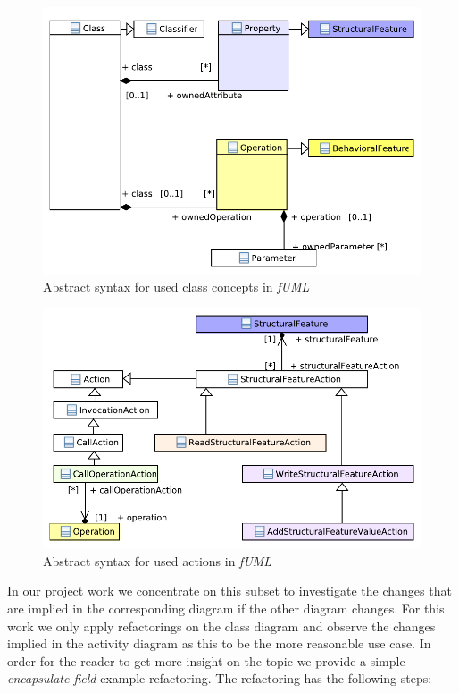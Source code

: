 \documentclass{llncs}
\begin{document}
\begin{figure}[h!t]
 \centering
 \includegraphics[scale=0.9]{images/Model_Model_Classifiers}
 \caption{Abstract syntax for used class concepts in \textit{fUML}}
 \label{fig:fuml1}
\end{figure}

\begin{figure}[h!t]
 \centering
 \includegraphics[scale=0.9]{images/Model_Model_Behavior}
 \caption{Abstract syntax for used actions in \textit{fUML}}
 \label{fig:fuml2}
\end{figure}

In our project work we concentrate on this subset to investigate the changes that are implied in the corresponding diagram if the other diagram changes. For this work we only apply refactorings on the class diagram and observe the changes implied in the activity diagram as this to be the more reasonable use case. In order for the reader to get more insight on the topic we provide a simple \textit{encapsulate field} example refactoring. The refactoring has the following steps:
\end{document}
